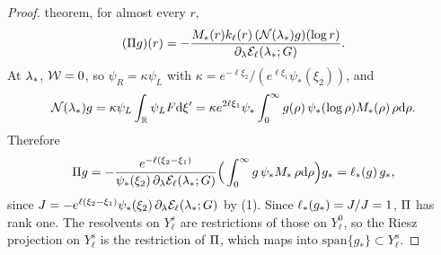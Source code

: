 \begin{proof}
theorem, for almost every $r$,
\[
(\Pi g)(r)=-\frac{M_*(r)k_\ell(r)\,(\mathcal N(\lambda_*)g)(\log r)}{\partial_\lambda\mathcal{E}_\ell(\lambda_*;G)} .
\]
At $\lambda_*$, $\mathcal{W}=0$, so $\psi_R=\kappa\psi_L$ with
$\kappa=e^{-\ell\xi_2}/(e^{\ell\xi_1}\psi_*(\xi_2))$, and
\[
\mathcal N(\lambda_*)g=\kappa\psi_L\int_{\mathbb{R}}\psi_LF\dd\xi'
=\kappa e^{2\ell\xi_1}\psi_*\int_0^\infty g(\rho)\,\psi_*(\log\rho)M_*(\rho)\,\rho\dd\rho .
\]
Therefore
\[
\Pi g=-\frac{e^{-\ell(\xi_2-\xi_1)}}{\psi_*(\xi_2)\,\partial_\lambda\mathcal{E}_\ell(\lambda_*;G)}
\Big(\int_0^\infty g\,\psi_*M_*\,\rho\dd\rho\Big)g_*=\ell_*(g)\,g_*,
\]
since
$J=-e^{\ell(\xi_2-\xi_1)}\psi_*(\xi_2)\,\partial_\lambda\mathcal{E}_\ell(\lambda_*;G)$ by
(1). Since $\ell_*(g_*)=J/J=1$, $\Pi$ has rank one. The resolvents on $Y^s_\ell$ are restrictions of those on $Y^0_\ell$, so
the Riesz projection on $Y^s_\ell$ is the restriction of $\Pi$, which maps into
$\mathrm{span}\{g_*\}\subset Y^s_\ell$.
\end{proof}

